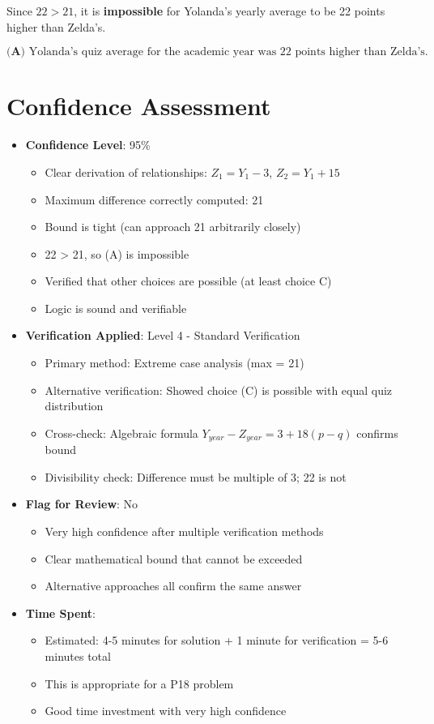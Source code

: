 \documentclass[12pt]{article}
\begin{document}
Since $22 > 21$, it is \textbf{impossible} for Yolanda's yearly average to be 22 points higher than Zelda's.

$$\boxed{\textbf{(A) } \text{Yolanda's quiz average for the academic year was 22 points higher than Zelda's.}}$$

\section*{Confidence Assessment}
\begin{itemize}[leftmargin=*]
    \item \textbf{Confidence Level}: 95\% 
    \begin{itemize}
        \item Clear derivation of relationships: $Z_1 = Y_1 - 3$, $Z_2 = Y_1 + 15$
        \item Maximum difference correctly computed: 21
        \item Bound is tight (can approach 21 arbitrarily closely)
        \item 22 > 21, so (A) is impossible
        \item Verified that other choices are possible (at least choice C)
        \item Logic is sound and verifiable
    \end{itemize}
    \item \textbf{Verification Applied}: Level 4 - Standard Verification
    \begin{itemize}
        \item Primary method: Extreme case analysis (max = 21)
        \item Alternative verification: Showed choice (C) is possible with equal quiz distribution
        \item Cross-check: Algebraic formula $Y_{year} - Z_{year} = 3 + 18(p-q)$ confirms bound
        \item Divisibility check: Difference must be multiple of 3; 22 is not
    \end{itemize}
    \item \textbf{Flag for Review}: No
    \begin{itemize}
        \item Very high confidence after multiple verification methods
        \item Clear mathematical bound that cannot be exceeded
        \item Alternative approaches all confirm the same answer
    \end{itemize}
    \item \textbf{Time Spent}: 
    \begin{itemize}
        \item Estimated: 4-5 minutes for solution + 1 minute for verification = 5-6 minutes total
        \item This is appropriate for a P18 problem
        \item Good time investment with very high confidence
    \end{itemize}
\end{itemize}
\end{document}
